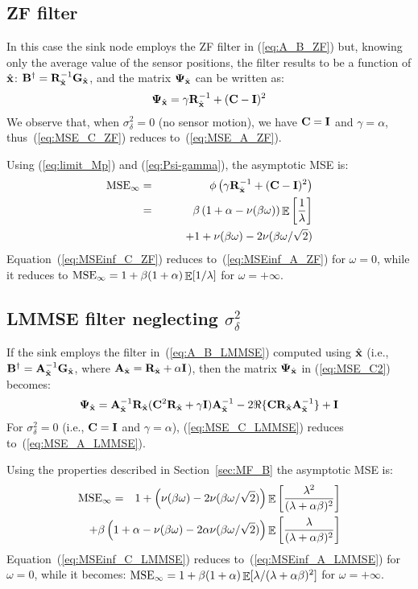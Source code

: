 \documentclass[final, a4paper]{IEEEtran}
\newcommand{\xv}{{\bf x}}
\newcommand{\Am}{{\bf A}}
\newcommand{\Bm}{{\bf B}}
\newcommand{\Cm}{{\bf C}}
\newcommand{\Gm}{{\bf G}}
\newcommand{\Id}{{\bf I}}
\newcommand{\Rm}{{\bf R}}
\def\xvh{{\hat{\xv}}}
\newcommand{\Psim}{\hbox{\boldmath$\Psi$}}
\def\non{\nonumber\\}
\def\MSEinf{{\rm MSE}_{\infty}}
\begin{document}
\subsection{ZF filter}

In this case the sink node employs the ZF filter in (\ref{eq:A_B_ZF}) but,
knowing only the average value of the sensor positions, the filter
results to be a function of $\xvh$: $\Bm\Herm = \Rm_\xvh^{-1}\Gm_\xvh$,
and the matrix $\Psim_\xvh$ can be written as:
\begin{equation}
\Psim_\xvh = \gamma \Rm_\xvh^{-1} + (\Cm-\Id)^2
\label{eq:MSE_C_ZF}
\end{equation}
We observe that, when $\sigma^2_\delta=0$ (no sensor motion), we have $\Cm=\Id$ and
$\gamma=\alpha$, thus~(\ref{eq:MSE_C_ZF}) reduces to~(\ref{eq:MSE_A_ZF}).

Using (\ref{eq:limit_Mp}) and (\ref{eq:Psi-gamma}),  the asymptotic MSE is:
\begin{eqnarray}
\MSEinf &=& \phi\left(\gamma \Rm_\xvh^{-1} + (\Cm-\Id)^2 \right) \non
&=&  \beta\left(1+\alpha-\nu(\beta\omega)\right)\EE\left[\frac{1}{\lambda}\right] \non
& & \qquad +1+\nu(\beta\omega) -2\nu(\beta\omega/\sqrt{2})
\label{eq:MSEinf_C_ZF}
\end{eqnarray}
Equation~(\ref{eq:MSEinf_C_ZF}) reduces to~(\ref{eq:MSEinf_A_ZF}) for $\omega=0$,
while it reduces to $\MSEinf=1+\beta(1+\alpha)\EE[1/\lambda]$ for $\omega=+\infty$.


\subsection{LMMSE filter neglecting $\sigma_{\delta}^2$  \label{subsec:neglecting-sigma_d}}

If the sink employs the filter in~(\ref{eq:A_B_LMMSE}) computed
using $\xvh$ (i.e., $\Bm\Herm = \Am^{-1}_\xvh\Gm_\xvh$, where $\Am_\xvh= \Rm_\xvh+\alpha\Id$), then the matrix $\Psim_\xvh$
in (\ref{eq:MSE_C2}) becomes:
\begin{equation}
\Psim_\xvh = \Am^{-1}_\xvh\Rm_\xvh(\Cm^2\Rm_\xvh +\gamma\Id)\Am^{-1}_\xvh -2\Re\{\Cm\Rm_\xvh\Am^{-1}_\xvh\} +\Id
\label{eq:MSE_C_LMMSE}
\end{equation}
For $\sigma^2_\delta=0$ (i.e., $\Cm=\Id$ and $\gamma=\alpha$),
(\ref{eq:MSE_C_LMMSE}) reduces to~(\ref{eq:MSE_A_LMMSE}).

Using the properties described in Section~\ref{sec:MF_B} the asymptotic MSE is:
\begin{eqnarray}
\MSEinf  &=& 1+\left(\nu(\beta\omega)-2\nu(\beta\omega/\sqrt{2})\right)
                 \EE\left[\frac{\lambda^2}{(\lambda+\alpha\beta)^2}\right]\non
 &\hspace{-18mm}&\hspace{-18mm}+\beta\left(1+\alpha-\nu(\beta\omega)
-2\alpha\nu(\beta\omega/\sqrt{2})\right)\EE\left[\frac{\lambda}{(\lambda+\alpha\beta)^2}\right]
\label{eq:MSEinf_C_LMMSE}
\end{eqnarray}
Equation~(\ref{eq:MSEinf_C_LMMSE}) reduces to~(\ref{eq:MSEinf_A_LMMSE}) for $\omega=0$,
while it becomes: $\MSEinf=1+\beta(1+\alpha)\EE[\lambda/(\lambda+\alpha\beta)^2]$  for $\omega=+\infty$.
\end{document}
